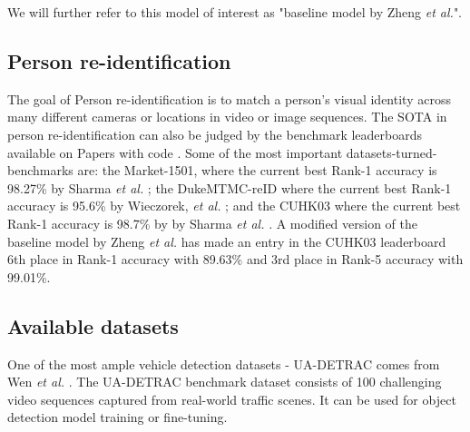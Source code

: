 \documentclass[conference]{IEEEtran} %
\begin{document}
		We will further refer to this model of interest as "baseline model by Zheng \textit{et al.}".
	
	\subsection{Person re-identification}
	
		The goal of Person re-identification is to match a person's visual identity across many different cameras or locations in video or image sequences. The SOTA in person re-identification can also be judged by the benchmark leaderboards available on Papers with code \cite{paperswithcode2024Persreid}. Some of the most important datasets-turned-benchmarks are: the Market-1501, where the current best Rank-1 accuracy is 98.27\% by Sharma \textit{et al.} \cite{sharma2021person}; the DukeMTMC-reID where the current best Rank-1 accuracy is 95.6\% by Wieczorek, \textit{et al.} \cite{wieczorek2021unreasonable}; and the CUHK03 where the current best Rank-1 accuracy is 98.7\% by by Sharma \textit{et al.} \cite{sharma2021person}. A modified version of the baseline model by Zheng \textit{et al.} has made an entry in the CUHK03 leaderboard 6th place in Rank-1 accuracy with 89.63\% and 3rd place in Rank-5 accuracy with 99.01\%.
		
	\subsection{Available datasets}
	
		One of the most ample vehicle detection datasets - UA-DETRAC comes from Wen \textit{et al.}  \cite{wen2020ua}. The UA-DETRAC benchmark dataset consists of 100 challenging video sequences captured from real-world traffic scenes. It can be used for object detection model training or fine-tuning.
		
\end{document}
